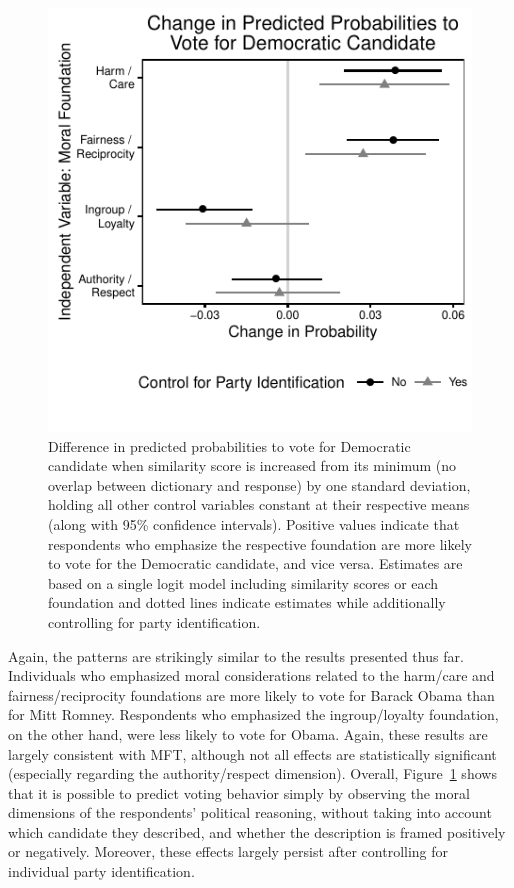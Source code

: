 \documentclass[12pt]{article}
\begin{document}
\begin{figure}[h]\centering
\includegraphics[scale=.9]{../calc/fig/logit_vote.pdf}
\caption{Difference in predicted probabilities to vote for Democratic candidate when similarity score is increased from its minimum (no overlap between dictionary and response) by one standard deviation, holding all other control variables constant at their respective means (along with 95\% confidence intervals). Positive values indicate that respondents who emphasize the respective foundation are more likely to vote for the Democratic candidate, and vice versa. Estimates are based on a single logit model including similarity scores or each foundation and dotted lines indicate estimates while additionally controlling for party identification. %
}\label{fig:logit_vote}
\end{figure}

Again, the patterns are strikingly similar to the results presented thus far. Individuals who emphasized moral considerations related to the harm/care and fairness/reciprocity foundations are more likely to vote for Barack Obama than for Mitt Romney. Respondents who emphasized the ingroup/loyalty foundation, on the other hand, were less likely to vote for Obama. Again, these results are largely consistent with MFT, although not all effects are statistically significant (especially regarding the authority/respect dimension). Overall, Figure~\ref{fig:logit_vote} shows that it is possible to predict voting behavior simply by observing the moral dimensions of the respondents' political reasoning, without taking into account which candidate they described, and whether the description is framed positively or negatively. Moreover, these effects largely persist after controlling for individual party identification.
\end{document}
